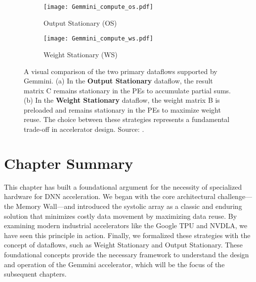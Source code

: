 \begin{figure}[htbp]
    \centering
    \begin{subfigure}[b]{0.48\textwidth}
        \centering
        \texttt{[image: Gemmini\_compute\_os.pdf]}
        \caption{Output Stationary (OS)}
        \label{fig:os_dataflow}
    \end{subfigure}
    \hfill
    \begin{subfigure}[b]{0.48\textwidth}
        \centering
        \texttt{[image: Gemmini\_compute\_ws.pdf]}
        \caption{Weight Stationary (WS)}
        \label{fig:ws_dataflow}
    \end{subfigure}
    \caption[Comparison of OS and WS Dataflows]{A visual comparison of the two primary dataflows supported by Gemmini. (a) In the \textbf{Output Stationary} dataflow, the result matrix C remains stationary in the PEs to accumulate partial sums. (b) In the \textbf{Weight Stationary} dataflow, the weight matrix B is preloaded and remains stationary in the PEs to maximize weight reuse. The choice between these strategies represents a fundamental trade-off in accelerator design. Source: \cite{gemini-dac}.}
    \label{fig:dataflow_comparison}
\end{figure}

\section{Chapter Summary}
This chapter has built a foundational argument for the necessity of specialized hardware for DNN acceleration. We began with the core architectural challenge---the Memory Wall---and introduced the systolic array as a classic and enduring solution that minimizes costly data movement by maximizing data reuse. By examining modern industrial accelerators like the Google TPU and NVDLA, we have seen this principle in action. Finally, we formalized these strategies with the concept of dataflows, such as Weight Stationary and Output Stationary. These foundational concepts provide the necessary framework to understand the design and operation of the Gemmini accelerator, which will be the focus of the subsequent chapters.